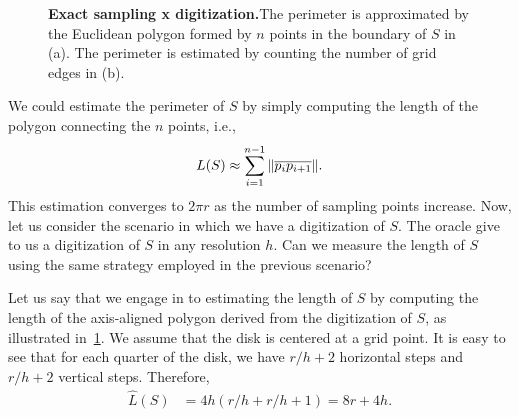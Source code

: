 \begin{figure}
{}\hspace{1em}
\caption{\textbf{Exact sampling x digitization.}The perimeter is approximated by the Euclidean polygon formed by $n$ points in the boundary of $S$ in (a). The perimeter is estimated by counting the number of grid edges in (b).}
\label{ch4:fig:exact-sampling-digitization}
\end{figure}

We could estimate the perimeter of $S$ by simply computing the length of the polygon  connecting the $n$ points, i.e., 
\begin{align*}
	L(S) \approx \sum_{i=1}^{n-1}{ \lVert \overline{p_ip_{i+1}} \rVert}.
\end{align*}
This estimation converges to $2\pi r$ as the number of sampling points increase. Now, let us consider the scenario in which we have a digitization of $S$. The oracle give to us a digitization of $S$ in any resolution $h$. Can we measure the length of $S$ using the same strategy employed in the previous scenario?

Let us say that we engage in to estimating the length of $S$ by computing the length of the axis-aligned polygon derived from the digitization of $S$, as illustrated in~\cref{ch4:fig:exact-sampling-digitization}. We assume that the disk is centered at a grid point. It is easy to see that for each quarter of the disk, we have $r/h + 2$ horizontal steps and $r/h + 2$ vertical steps. Therefore,
\begin{align*}
	\hat{L}(S) &= 4h(r/h + r/h + 1) = 8r + 4h.
\end{align*}

